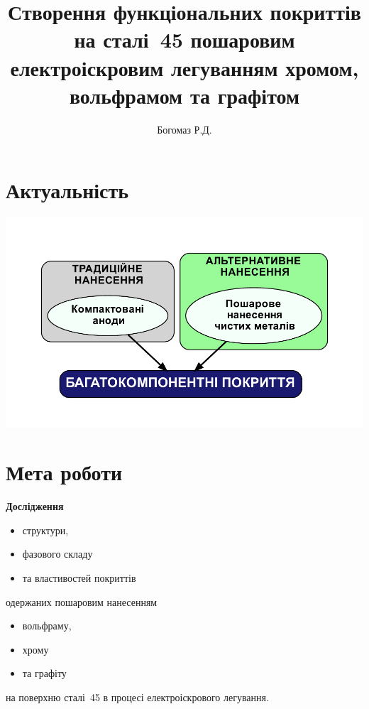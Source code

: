 \documentclass[12pt,aspectratio=43,hyperref={unicode}]{beamer}
\title{Створення функціональних покриттів на сталі~45 пошаровим електроіскровим легуванням хромом, вольфрамом та графітом}
\author{Богомаз Р.Д.}
\date{}
\begin{document}
\begin{frame}[plain]
  \titlepage
\end{frame}

\section{Актуальність}
\begin{frame}

\centering
\includegraphics[width=\textwidth, trim={1.5cm 0cm 1.5cm 1.5cm},clip]{graph.pdf}



\end{frame}


\section{Мета роботи} %
\begin{frame}

\begin{block}{\textbf{Дослідження}}
\vspace{-0.3cm}
\begin{itemize}
  \item структури,
  \item фазового складу
  \item та властивостей покриттів
\end{itemize}
одержаних пошаровим нанесенням
\begin{itemize}
  \item вольфраму,
  \item хрому
  \item та графіту
\end{itemize}
на поверхню сталі~45 в процесі електроіскрового легування.
\end{block}


\end{frame}
\end{document}
